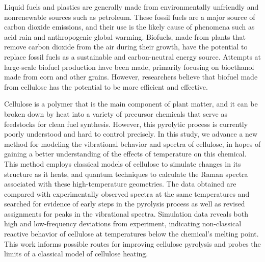 Liquid fuels and plastics are generally made from environmentally unfriendly and nonrenewable sources such as petroleum. These fossil fuels are a major source of carbon dioxide emissions, and their use is the likely cause of phenomena such as acid rain and anthropogenic global warming. Biofuels, made from plants that remove carbon dioxide from the air during their growth, have the potential to replace fossil fuels as a sustainable and carbon-neutral energy source. Attempts at large-scale biofuel production have been made, primarily focusing on bioethanol made from corn and other grains. However, researchers believe that biofuel made from cellulose has the potential to be more efficient and effective. 


Cellulose is a polymer that is the main component of plant matter, and it can be broken down by heat into a variety of precursor chemicals that serve as feedstocks for clean fuel synthesis. However, this pyrolytic process is currently poorly understood and hard to control precisely. In this study, we advance a new method for modeling the vibrational behavior and spectra of cellulose, in hopes of gaining a better understanding of the effects of temperature on this chemical. This method employs classical models of cellulose to simulate changes in its structure as it heats, and quantum techniques to calculate the Raman spectra associated with these high-temperature geometries. The data obtained are compared with experimentally observed spectra at the same temperatures and searched for evidence of early steps in the pyrolysis process as well as revised assignments for peaks in the vibrational spectra. Simulation data reveals both high and low-frequency deviations from experiment, indicating non-classical reactive behavior of cellulose at temperatures below the chemical's melting point. This work informs possible routes for improving cellulose pyrolysis and probes the limits of a classical model of cellulose heating.